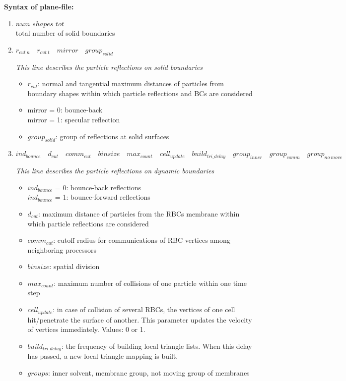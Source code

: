 \documentclass[a4paper,10pt]{scrreprt}
\begin{document}
\textbf{Syntax of plane-file:}
\begin{enumerate}
\item $ num\_shapes\_tot$\\
total number of solid boundaries

\item $  r_{cut\ n} \quad   r_{cut\ t} \quad   mirror \quad   group_{solid}$

	{\em This line describes the particle reflections on solid boundaries}
	\begin{itemize}
	\item $ r_{cut}$: normal and tangential maximum distances of particles from boundary shapes within which particle reflections and BCs are considered
	\item mirror = 0: bounce-back\\ mirror = 1: specular reflection
	\item $ group_{solid}$: group of reflections at solid surfaces
	\end{itemize}

\item $  ind_{bounce} \quad   d_{cut} \quad   comm_{cut} \quad   binsize \quad   max_{count} \quad   cell_{update} \quad build_{tri\_delay} \quad group_{inner} \quad   group_{comm} \quad   group_{no\ move}$	

	{\em This line describes the particle reflections on dynamic boundaries}
	\begin{itemize}
	\item $ ind_{bounce}$ = 0: bounce-back reflections\\ $ind_{bounce}$ = 1: bounce-forward reflections
	\item $ d_{cut}$: maximum distance of particles from the RBCs membrane within which particle reflections are considered
	\item $ comm_{cut}$: cutoff radius for communications of RBC vertices among neighboring processors
	\item $ binsize$: spatial division
	\item $ max_{count}$: maximum number of collisions of one particle within one time step
	\item $ cell_{update}$: in case of collision of several RBCs, the vertices of one cell hit/penetrate the surface of another. This parameter updates the velocity of vertices immediately. Values: 0 or 1.
        \item $build_{tri\_delay}$: the frequency of building local triangle lists. When this delay has passed, a new local triangle mapping is built. 
	\item $groups$: inner solvent, membrane group, not moving group of membranes
	\end{itemize}


\end{enumerate}
\end{document}
